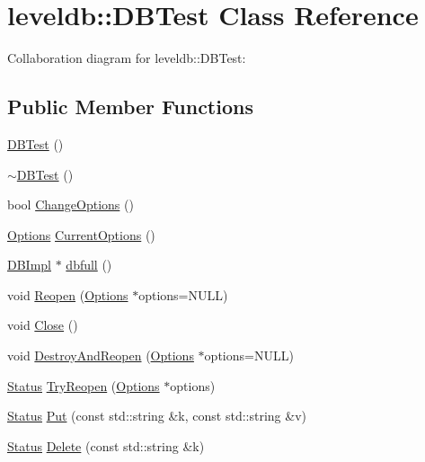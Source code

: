 \hypertarget{classleveldb_1_1_d_b_test}{\section{leveldb\-:\-:D\-B\-Test Class Reference}
\label{classleveldb_1_1_d_b_test}
}


Collaboration diagram for leveldb\-:\-:D\-B\-Test\-:
\subsection*{Public Member Functions}
\begin{DoxyCompactItemize}
\item 
\hyperlink{classleveldb_1_1_d_b_test_afc6fc9512e900de6ee10c5db15b22930}{D\-B\-Test} ()
\item 
\hyperlink{classleveldb_1_1_d_b_test_a2268045d59c3a74bba03877819e36b55}{$\sim$\-D\-B\-Test} ()
\item 
bool \hyperlink{classleveldb_1_1_d_b_test_a587534fe403016f15cf1997ef7a40836}{Change\-Options} ()
\item 
\hyperlink{structleveldb_1_1_options}{Options} \hyperlink{classleveldb_1_1_d_b_test_a68db410e16195a3b67822bec05c06547}{Current\-Options} ()
\item 
\hyperlink{classleveldb_1_1_d_b_impl}{D\-B\-Impl} $\ast$ \hyperlink{classleveldb_1_1_d_b_test_a67de35d247ea077c1e4fdf2a7a0f0514}{dbfull} ()
\item 
void \hyperlink{classleveldb_1_1_d_b_test_a38170a082cbc71fb446408ff5634c797}{Reopen} (\hyperlink{structleveldb_1_1_options}{Options} $\ast$options=N\-U\-L\-L)
\item 
void \hyperlink{classleveldb_1_1_d_b_test_aee76446bbb9c34cdb1ae00318689aead}{Close} ()
\item 
void \hyperlink{classleveldb_1_1_d_b_test_ab798a43e7feab6dddc8fa1eb7a5f61f6}{Destroy\-And\-Reopen} (\hyperlink{structleveldb_1_1_options}{Options} $\ast$options=N\-U\-L\-L)
\item 
\hyperlink{classleveldb_1_1_status}{Status} \hyperlink{classleveldb_1_1_d_b_test_aee588b2d13db6be2a651a8fabeac5c79}{Try\-Reopen} (\hyperlink{structleveldb_1_1_options}{Options} $\ast$options)
\item 
\hyperlink{classleveldb_1_1_status}{Status} \hyperlink{classleveldb_1_1_d_b_test_a5ec1a1d5ecc1744f325159eb81e46514}{Put} (const std\-::string \&k, const std\-::string \&v)
\item 
\hyperlink{classleveldb_1_1_status}{Status} \hyperlink{classleveldb_1_1_d_b_test_a25716ec93d525adbeea8ff71e8f3a9f4}{Delete} (const std\-::string \&k)

\end{DoxyCompactItemize}
